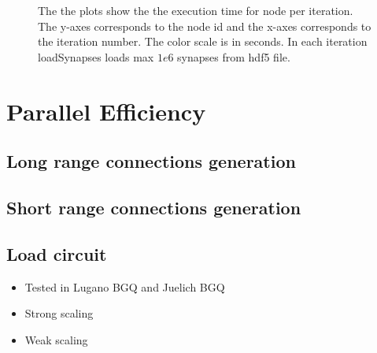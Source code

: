 \begin{figure}[ht!]
\begin{center}
{        }
    \end{center}
    \caption{%
        The the plots show the the execution time for node per iteration.
        The y-axes corresponds to the node id and the x-axes corresponds to the iteration number.
        The color scale is in seconds.
        In each iteration loadSynapses loads max $1e6$ synapses from hdf5 file.
     }%
   \label{fig:implV03}
\end{figure}


\newpage
\section{Parallel Efficiency}

\subsection{Long range connections generation}
\subsection{Short range connections generation}
\subsection{Load circuit}

\begin{itemize}
      \item Tested in Lugano BGQ and Juelich BGQ
      \item Strong scaling
      \item Weak scaling
\end{itemize}

